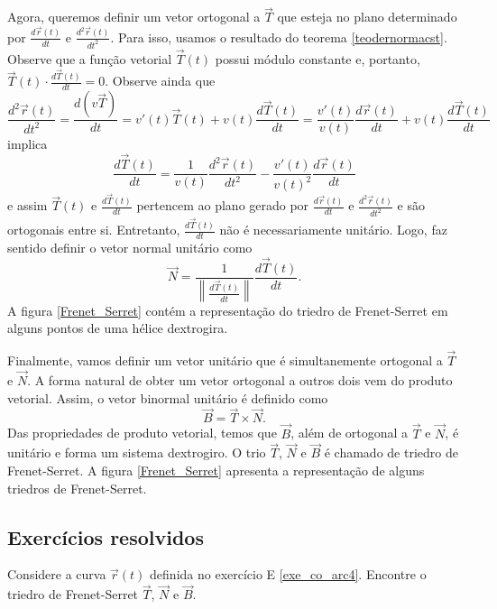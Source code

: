 Agora, queremos definir um vetor ortogonal a $\vec{T}$ que esteja no plano determinado por $\frac{d\vec{r}(t)}{dt}$ e $\frac{d^2\vec{r}(t)}{dt^2}$. Para isso, usamos o resultado do teorema \ref{teodernormacst}. Observe que a função vetorial $\vec{T}(t)$ possui módulo constante e, portanto, $\vec{T}(t)\cdot \frac{d\vec{T}(t)}{dt}=0$. Observe ainda que 
$$
\frac{d^2\vec{r}(t)}{dt^2}=\frac{d (v \vec{T} )}{dt} = v'(t) \vec{T}(t) + v(t) \frac{d \vec{T}(t)}{dt} = \frac{v'(t)}{v(t)} \frac{d\vec{r}(t)}{dt}+ v(t) \frac{d\vec{T}(t)}{dt}
$$
implica
$$ \frac{d\vec{T}(t)}{dt} = \frac{1}{v(t)} \frac{d^2 \vec{r}(t)}{dt^2} - \frac{v'(t)}{v(t)^2} \frac{d \vec{r}(t)}{dt}
$$
e assim 
$\vec{T}(t)$ e $\frac{d\vec{T}(t)}{dt}$ pertencem ao plano gerado por $\frac{d\vec{r}(t)}{dt} $ e $\frac{d^2\vec{r}(t)}{dt^2}$ e são ortogonais entre si. Entretanto, $\frac{d\vec{T}(t)}{dt}$ não é necessariamente unitário. Logo, faz sentido definir o vetor normal unitário como
$$
\vec{N}=\frac{1}{\left\|\frac{d\vec{T}(t)}{dt}\right\|} \frac{d \vec{T}(t)}{dt}.
$$
A figura \ref{Frenet_Serret} contém a representação do triedro de Frenet-Serret em alguns pontos de uma hélice dextrogira.

Finalmente, vamos definir um vetor unitário que é simultanemente ortogonal a $\vec{T}$ e $\vec{N}$. A forma natural de obter um vetor ortogonal a outros dois vem do produto vetorial. Assim, o vetor binormal unitário é definido como
$$
\vec{B}=\vec{T}\times\vec{N}.
$$
Das propriedades de produto vetorial, temos que $\vec{B}$, além de ortogonal a $\vec{T}$ e $\vec{N}$, é unitário e forma um sistema dextrogiro. O trio $\vec{T}$, $\vec{N}$ e $\vec{B}$ é chamado de triedro de Frenet-Serret. A figura \ref{Frenet_Serret} apresenta a representação de alguns triedros de Frenet-Serret.


\subsection*{Exercícios resolvidos}

\construirExeresol

\begin{exer}
  Considere a curva $\vec{r}(t)$ definida no exercício E \ref{exe_co_arc4}. Encontre o triedro de Frenet-Serret $\vec{T}$, $\vec{N}$ e $\vec{B}$.
\end{exer}


